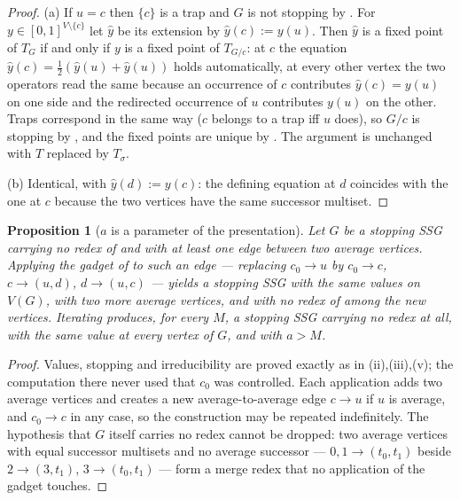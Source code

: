 \documentclass[11pt]{article}
\theoremstyle{plain}
\newtheorem{proposition}[theorem]{Proposition}
\theoremstyle{definition}
\begin{document}
\begin{proof}
(a) If $u=c$ then $\{c\}$ is a trap and $G$ is not stopping by
. For $y\in[0,1]^{V\setminus\{c\}}$ let $\hat y$ be its
extension by $\hat y(c):=y(u)$. Then $\hat y$ is a fixed point of $T_G$
if and only if $y$ is a fixed point of $T_{G/c}$: at $c$ the equation
$\hat y(c)=\frac12(\hat y(u)+\hat y(u))$ holds automatically, at every
other vertex the two operators read the same because an occurrence of
$c$ contributes $\hat y(c)=y(u)$ on one side and the redirected
occurrence of $u$ contributes $y(u)$ on the other. Traps correspond in
the same way ($c$ belongs to a trap iff $u$ does), so $G/c$ is stopping
by , and the fixed points are unique by
. The argument is unchanged with $T$ replaced by
$T_\sigma$.

(b) Identical, with $\hat y(d):=y(c)$: the defining equation at $d$
coincides with the one at $c$ because the two vertices have the same
successor multiset.
\end{proof}

\begin{proposition}[$a$ is a parameter of the presentation]\label{prop:a-presentation}
Let $G$ be a stopping SSG carrying no redex of  and
with at least one edge between two average vertices. Applying the gadget
of  to such an edge
--- replacing $c_0\to u$ by $c_0\to c$, $c\to(u,d)$, $d\to(u,c)$ ---
yields a stopping SSG with the same values on $V(G)$, with two more
average vertices, and with no redex of  among the new
vertices. Iterating produces, for every $M$, a stopping SSG carrying no
redex at all, with the same value at every vertex of $G$, and with
$a>M$.
\end{proposition}

\begin{proof}
Values, stopping and irreducibility are proved exactly as in
(ii),(iii),(v); the computation there never used
that $c_0$ was controlled. Each application adds two average vertices and
creates a new average-to-average edge $c\to u$ if $u$ is average, and
$c_0\to c$ in any case, so the construction may be repeated
indefinitely. The hypothesis that $G$ itself carries no redex cannot be
dropped: two average vertices with equal successor multisets and no
average successor --- $0,1\to(t_0,t_1)$ beside $2\to(3,t_1)$,
$3\to(t_0,t_1)$ --- form a merge redex that no application of the gadget
touches.
\end{proof}
\end{document}
